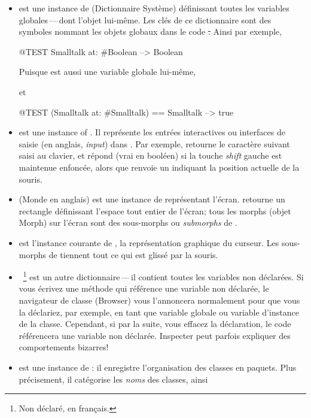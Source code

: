 \documentclass[a4paper,10pt,twoside]{book}
\begin{document}
\begin{itemize}
\item
{} est une instance de  (Dictionnaire Système) définissant toutes les variables globales\,---\,dont l'objet  lui-même.   
Les clés de ce dictionnaire sont des symboles nommant les objets globaux dans le code \st.
Ainsi par exemple,
\begin{code}{@TEST}
Smalltalk at: #Boolean --> Boolean
\end{code}
Puisque  est aussi une variable globale lui-même,
\begin{code}{}
Smalltalk at: #Smalltalk-->a SystemDictionary(lots of globals)}
\end{code} 
et
\begin{code}{@TEST}
(Smalltalk at: #Smalltalk) == Smalltalk --> true
\end{code}

\item {} est une instance of . Il représente les entrées interactives ou interfaces de saisie (en anglais, \emph{input}) dans \pharo. Par exemple,  retourne le caractère suivant saisi au clavier, et  répond  (vrai en booléen) si la touche \emph{shift} gauche est maintenue enfoncée, alors que  renvoie un  indiquant la position actuelle de la souris.

\item {} (Monde en anglais) est une instance de  représentant l'écran.
 retourne un rectangle définissant l'espace tout entier de l'écran; tous les morphs (objet Morph) sur l'écran sont des sous-morphs ou \emph{submorphs} de .

\item {} est l'instance courante de , la représentation graphique du curseur. Les sous-morphs de  tiennent tout ce qui est glissé par la souris.

\item
{}~\footnote{Non déclaré, en français.} est un autre dictionnaire\,---\,il contient toutes les variables non déclarées.
Si vous écrivez une méthode qui référence une variable non déclarée,
le navigateur de classe (Browser) vous l'annoncera normalement
pour que vous la déclariez, par exemple, en tant que variable globale ou variable d'instance de la classe.
Cependant, si par la suite, vous effacez la déclaration, le code référencera une variable non déclarée. 
Inspecter  peut parfois expliquer des comportements bizarres!

\item
{} est une instance de
: il enregistre l'organisation des classes en
paquets.  Plus précisement, il catégorise les \emph{noms} des
classes, ainsi
\end{itemize} %
\end{document}
